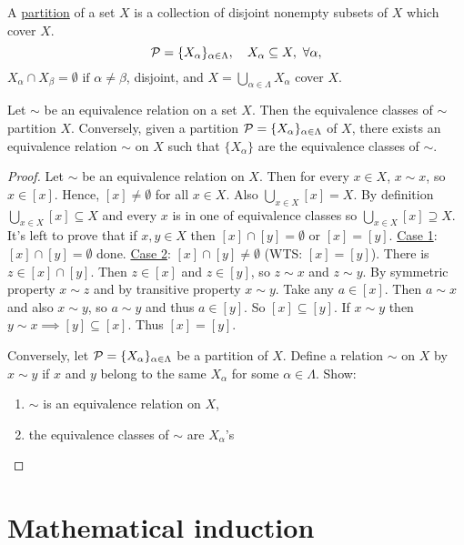 \documentclass[]{article}
\begin{document}
\begin{definition}
	A \ul{partition} of a set $X$ is a collection of disjoint nonempty subsets of $X$ which cover $X$.
	$$\mathcal{P} = \{X_\alpha\}_{\alpha\in \Lambda}, \quad X_\alpha\subseteq X,\ \forall \alpha,$$
	$X_\alpha \cap X_\beta = \emptyset \text{ if } \alpha \neq \beta$, disjoint, and $X = \bigcup_{\alpha\in\Lambda} X_\alpha$ cover $X$.
\end{definition}
\begin{theorem}
	Let $\sim $ be an equivalence relation on a set $X$. Then the equivalence classes of $\sim$ partition $X$. Conversely, given a partition $\mathcal{P} = \{X_\alpha\}_{\alpha\in\Lambda}$ of $X$, there exists an equivalence relation $\sim$ on $X$ such that $\{X_\alpha\}$ are the equivalence classes of $\sim$.
\end{theorem}
\begin{proof}
	Let $\sim$ be an equivalence relation on $X$. Then for every $x\in X$, $x\sim x$, so $x\in [x]$. Hence, $[x]\neq \emptyset$ for all $x\in X$. Also $\bigcup_{x\in X}[x] = X$. By definition $\bigcup_{x\in X}[x] \subseteq X$ and  every $x$ is in one of equivalence classes so $\bigcup_{x\in X}[x] \supseteq X$. It's left to prove that if $x,y\in X$ then $[x]\cap [y] = \emptyset$ or $[x]=[y]$.
	\ul{Case 1}: $[x]\cap[y] = \emptyset$ done. \ul{Case 2}: $[x]\cap[y]\neq \emptyset$ (WTS: $[x]=[y]$). There is $z\in[x]\cap[y]$. Then $z\in[x]$ and $z\in[y]$, so $z\sim x$ and $z\sim y$. By symmetric property $x\sim z$ and by transitive property $x\sim y$. Take any $a\in [x]$. Then $a\sim x$ and also $x\sim y$, so $a\sim y$ and thus $a\in [y]$. So $[x]\subseteq [y]$. If $x\sim y$ then $y\sim x \implies [y]\subseteq [x]$. Thus $[x]=[y]$.
	
	Conversely, let $\mathcal{P} = \{X_\alpha\}_{\alpha\in\Lambda}$ be a partition of $X$. Define a relation $\sim$ on $X$ by $x\sim y$ if $x$ and $y$ belong to the same $X_\alpha$ for some $\alpha\in\Lambda$. Show:
	\begin{enumerate}
		\item $\sim$ is an equivalence relation on $X$,
		\item the equivalence classes of $\sim$ are $X_\alpha$'s
	\end{enumerate}
\end{proof}

\section*{Mathematical induction}
\end{document}
